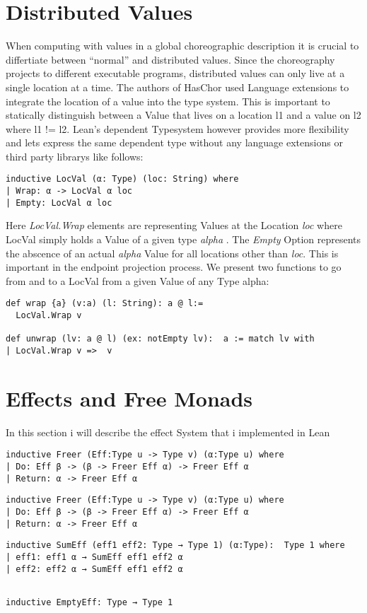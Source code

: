 \section{Distributed Values}
When computing with values in a global choreographic description it is crucial to differtiate between ``normal'' and distributed values. Since the choreography projects to different executable programs, distributed values can only live at a single location at a time. The authors of HasChor used Language extensions to integrate the location of a value into the type system. This is important to statically distinguish between a Value that lives on a location l1 and a value on l2 where l1 != l2.
Lean's dependent Typesystem however provides more flexibility and lets express the same dependent type without any language extensions or third party librarys like follows:
\begin{lstlisting}[language=lean]
inductive LocVal (α: Type) (loc: String) where
| Wrap: α -> LocVal α loc
| Empty: LocVal α loc
\end{lstlisting}
Here \emph{LocVal.Wrap} elements are representing Values at the Location \emph{loc} where LocVal simply holds a Value of a given type \emph{ alpha }.
The \emph{Empty} Option represents the abscence of an actual \emph{alpha} Value for all locations other than \emph{loc}. This is important in the endpoint projection process. We present two functions to go from and to a LocVal from a given Value of any Type alpha:

\begin{lstlisting}[language=lean]
def wrap {a} (v:a) (l: String): a @ l:=
  LocVal.Wrap v

def unwrap (lv: a @ l) (ex: notEmpty lv):  a := match lv with
| LocVal.Wrap v =>  v

\end{lstlisting}

\section{Effects and Free Monads}
In this section i will describe the effect System that i implemented in Lean

\begin{lstlisting}[language=lean]
inductive Freer (Eff:Type u -> Type v) (α:Type u) where
| Do: Eff β -> (β -> Freer Eff α) -> Freer Eff α
| Return: α -> Freer Eff α
\end{lstlisting}

\begin{lstlisting}[language=lean]
inductive Freer (Eff:Type u -> Type v) (α:Type u) where
| Do: Eff β -> (β -> Freer Eff α) -> Freer Eff α
| Return: α -> Freer Eff α
\end{lstlisting}
\begin{lstlisting}[language=lean]
inductive SumEff (eff1 eff2: Type → Type 1) (α:Type):  Type 1 where
| eff1: eff1 α → SumEff eff1 eff2 α
| eff2: eff2 α → SumEff eff1 eff2 α
\end{lstlisting}

\begin{lstlisting}[language=lean]

inductive EmptyEff: Type → Type 1
\end{lstlisting}

\begin{lstlisting}[language=lean]
\end{lstlisting}
